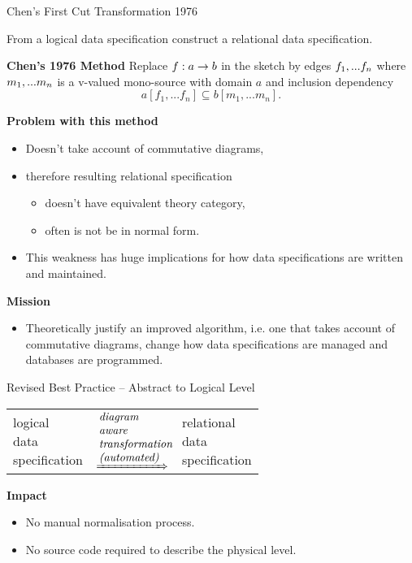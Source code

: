\begin{frame}{ Chen's First Cut Transformation 1976}
\begin{construction}
From a logical data specification construct a relational data specification.
\end{construction}
\textbf{Chen's 1976 Method}
Replace $f:a \rightarrow b$ in the sketch by edges $f_1,...f_n$
where $m_1,...m_n$ is a v-valued mono-source with domain $a$ 
and inclusion dependency 
$$a[f_1,...f_n] \subseteq b[m_1,...m_n].$$

\textbf{Problem with this method}
\begin{itemize}
	\item Doesn't take account of commutative diagrams,
	\item therefore resulting relational specification
	\begin{itemize}
		\item doesn't have equivalent theory category,
		\item often is not be in normal form.  
	\end{itemize}
	\item This weakness has huge implications for how data specifications are written and maintained.
\end{itemize}
\textbf{Mission}
\begin{itemize}
	\item Theoretically justify an improved algorithm, i.e. one that takes account of commutative diagrams, change how data specifications are managed and databases are programmed.
\end{itemize}
\end{frame}

\newcommand{\newtrans}{\parbox{2cm}{\textit{diagram \\ aware \\ transformation \\ (automated)}}}
\begin{frame}{Revised Best Practice -- Abstract to Logical Level}

\begin{center}
\begin{tabular}{ p{1.25cm} p{2cm} p{1.25cm}}
\parbox{3cm}{logical \\ data \\ specification}&  $\xRightarrow{\newtrans}$ & \parbox{3cm}{relational \\ data \\specification}
\end{tabular}
\end{center}
\textbf{Impact}
\begin{itemize}
	\item No manual normalisation process.
	\item No source code required to describe the physical level.
\end{itemize}
\end{frame}


